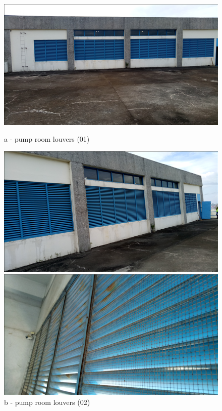 \begin{figure}
	\begin{minipage}[b]{0.22\linewidth}
		\centering
		\includegraphics[width=\textwidth]{figures/fig_ch047_wem_louverpanel_full1}
		\caption*{a - pump room louvers (01)}
		\label{ch047_wem_louverpanel_full1}
	\end{minipage}
	\hspace{0.05cm}
	\begin{minipage}[b]{0.22\linewidth}
		\centering
		\includegraphics[width=\textwidth]{figures/fig_ch047_wem_louverpanel_full2}
		\caption*{b - pump room louvers (02)}
		\label{ch047_wem_louverpanel_full2}
	\end{minipage}
	\hspace{0.05cm}
	\begin{minipage}[b]{0.22\linewidth}
		\centering
		\includegraphics[width=\textwidth]{figures/fig_ch047_wem_louverpanel_upclose}

\end{minipage}
\end{figure}
